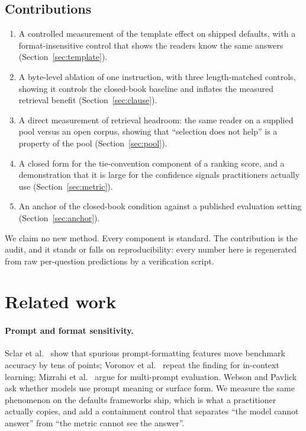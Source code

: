 ﻿\documentclass[11pt]{article}
\begin{document}
\subsection*{Contributions}
\begin{enumerate}
\item A controlled measurement of the template effect on shipped defaults, with a
format-insensitive control that shows the readers know the same answers
(Section~\ref{sec:template}).
\item A byte-level ablation of one instruction, with three length-matched controls, showing it
controls the closed-book baseline and inflates the measured retrieval benefit
(Section~\ref{sec:clause}).
\item A direct measurement of retrieval headroom: the same reader on a supplied pool versus an
open corpus, showing that ``selection does not help'' is a property of the pool
(Section~\ref{sec:pool}).
\item A closed form for the tie-convention component of a ranking score, and a demonstration
that it is large for the confidence signals practitioners actually use
(Section~\ref{sec:metric}).
\item An anchor of the closed-book condition against a published evaluation setting
(Section~\ref{sec:anchor}).
\end{enumerate}

We claim no new method. Every component is standard. The contribution is the audit, and it
stands or falls on reproducibility: every number here is regenerated from raw per-question
predictions by a verification script.

\section{Related work}

\paragraph{Prompt and format sensitivity.}
Sclar et al.~\cite{sclar2024quantifying} show that spurious prompt-formatting features move
benchmark accuracy by tens of points; Voronov et al.~\cite{voronov2024mind} repeat the finding
for in-context learning; Mizrahi et al.~\cite{mizrahi2024state} argue for multi-prompt
evaluation. Webson and Pavlick~\cite{webson2022prompt} ask whether models use prompt meaning or
surface form. We measure the same phenomenon on the defaults frameworks ship, which is what a
practitioner actually copies, and add a containment control that separates ``the model cannot
answer'' from ``the metric cannot see the answer''.
\end{document}
